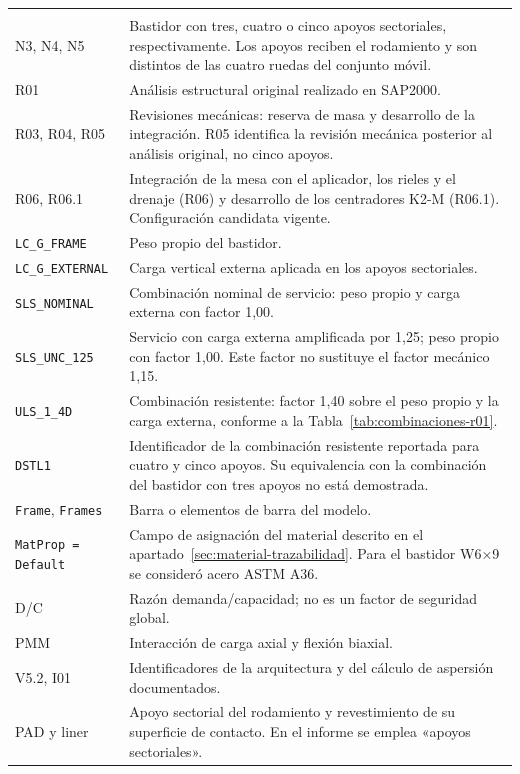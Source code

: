 \begin{longtable}{@{}>{\raggedright\arraybackslash}p{3.6cm}>{\raggedright\arraybackslash}p{\dimexpr(\textwidth-3.6cm-2\tabcolsep)/1\relax}@{}}
\midrule\endhead
\midrule\multicolumn{2}{r}{\textit{Continúa en la página siguiente.}}\\\endfoot
\bottomrule\endlastfoot
N3, N4, N5 & Bastidor con tres, cuatro o cinco apoyos sectoriales, respectivamente. Los apoyos reciben el rodamiento y son distintos de las cuatro ruedas del conjunto móvil.\\
R01 & Análisis estructural original realizado en SAP2000.\\
R03, R04, R05 & Revisiones mecánicas: reserva de masa y desarrollo de la integración. R05 identifica la revisión mecánica posterior al análisis original, no cinco apoyos.\\
R06, R06.1 & Integración de la mesa con el aplicador, los rieles y el drenaje (R06) y desarrollo de los centradores K2-M (R06.1). Configuración candidata vigente.\\
\texttt{LC\_G\_FRAME} & Peso propio del bastidor.\\
\texttt{LC\_G\_EXTERNAL} & Carga vertical externa aplicada en los apoyos sectoriales.\\
\texttt{SLS\_NOMINAL} & Combinación nominal de servicio: peso propio y carga externa con factor 1,00.\\
\texttt{SLS\_UNC\_125} & Servicio con carga externa amplificada por 1,25; peso propio con factor 1,00. Este factor no sustituye el factor mecánico 1,15.\\
\texttt{ULS\_1\_4D} & Combinación resistente: factor 1,40 sobre el peso propio y la carga externa, conforme a la Tabla~\ref{tab:combinaciones-r01}.\\
\texttt{DSTL1} & Identificador de la combinación resistente reportada para cuatro y cinco apoyos. Su equivalencia con la combinación del bastidor con tres apoyos no está demostrada.\\
\texttt{Frame}, \texttt{Frames} & Barra o elementos de barra del modelo.\\
\texttt{MatProp = Default} & Campo de asignación del material descrito en el apartado~\ref{sec:material-trazabilidad}. Para el bastidor W6×9 se consideró acero ASTM A36.\\
D/C & Razón demanda/capacidad; no es un factor de seguridad global.\\
PMM & Interacción de carga axial y flexión biaxial.\\
V5.2, I01 & Identificadores de la arquitectura y del cálculo de aspersión documentados.\\
PAD y liner & Apoyo sectorial del rodamiento y revestimiento de su superficie de contacto. En el informe se emplea «apoyos sectoriales».\\

\end{longtable}
